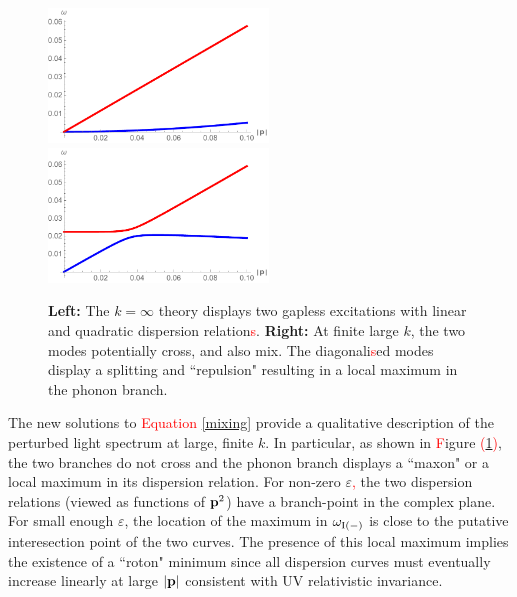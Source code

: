\begin{figure}[h]
\begin{center}
\includegraphics[width=2.3in]{Chapter_3_Folder_1806.06976/figures/crossing0.pdf}\hspace{0.8in}\includegraphics[width=2.3in]{Chapter_3_Folder_1806.06976/figures/crossing.pdf}
\end{center}
    \caption[This figure shows how the inclusion of a Chern-Simons term causes a level-splitting.]{ {\bf Left:} The $k=\infty$ theory displays two gapless excitations with linear and quadratic dispersion relation\textcolor{red}{s}. {\bf Right:} At finite large $k$, the two modes potentially cross, and also mix. The diagonali\textcolor{red}{s}ed modes display  a splitting and ``repulsion" resulting in a local maximum in the phonon branch.
}\label{cross}
\end{figure}

The new solutions to \textcolor{red}{Equation} \eqref{mixing} provide a qualitative description of the perturbed light spectrum at large, finite $k$.  
In particular, as shown in \textcolor{red}{F}igure \textcolor{red}{(}\ref{cross}\textcolor{red}{)}, the two branches do not cross and the phonon branch displays a ``maxon" or a local maximum in its dispersion relation.  
For non-zero $\varepsilon$\textcolor{red}{,} the two dispersion relations (viewed as functions of ${\bf p}^2$) have a branch-point in the complex plane. For small enough $\varepsilon$, the location of the maximum in $\omega_{\rm I(-)}$ is close to the putative interesection point of the two curves.
The presence of this local maximum implies the existence of a ``roton" minimum since all dispersion curves must eventually increase linearly at large $|{\bf p}|$ consistent with UV relativistic invariance. 

